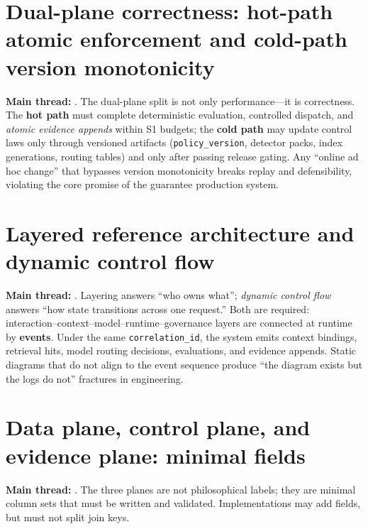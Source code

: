 \documentclass[11pt,a4paper]{report}
\begin{document}
\section{Dual-plane correctness: hot-path atomic enforcement and cold-path version monotonicity}
\textbf{Main thread:} \ControlPlane{}. The dual-plane split is not only performance—it is correctness. The \textbf{hot path} must complete deterministic evaluation, controlled dispatch, and \emph{atomic evidence appends} within S1 budgets; the \textbf{cold path} may update control laws only through versioned artifacts (\texttt{policy\_version}, detector packs, index generations, routing tables) and only after passing release gating. Any “online ad hoc change” that bypasses version monotonicity breaks replay and defensibility, violating the core promise of the guarantee production system.

\section{Layered reference architecture and dynamic control flow}
\textbf{Main thread:} \ControlPlane{}. Layering answers “who owns what”; \emph{dynamic control flow} answers “how state transitions across one request.” Both are required: interaction–context–model–runtime–governance layers are connected at runtime by \textbf{events}. Under the same \texttt{correlation\_id}, the system emits context bindings, retrieval hits, model routing decisions, \SafetyKernel{} evaluations, and evidence appends. Static diagrams that do not align to the event sequence produce “the diagram exists but the logs do not” fractures in engineering.

\section{Data plane, control plane, and evidence plane: minimal fields}
\textbf{Main thread:} \ControlPlane{}. The three planes are not philosophical labels; they are minimal column sets that must be written and validated. Implementations may add fields, but must not split join keys.
\end{document}
